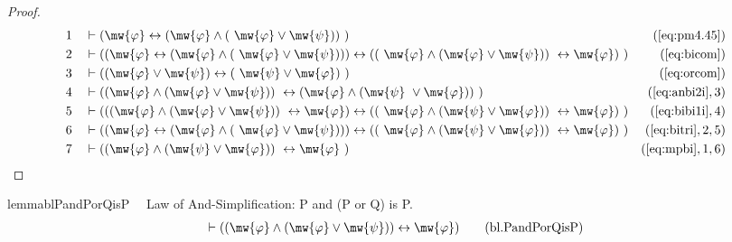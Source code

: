 \begin{proof}
\begin{align}
  1 &&  & \vdash ( \mw{\varphi} \leftrightarrow ( \mw{\varphi} \wedge (
     ~\mw{\varphi} \vee \mw{\psi} ) )
     ~)&(\mbox{\ref{eq:pm4.45}})\notag
  \\ 2 &&  & \vdash ( ( \mw{\varphi} \leftrightarrow ( \mw{\varphi} \wedge (
     ~\mw{\varphi} \vee \mw{\psi} ) ) ) \leftrightarrow ( (
     ~\mw{\varphi} \wedge ( \mw{\varphi} \vee \mw{\psi} ) )
     ~\leftrightarrow \mw{\varphi} )
     ~)&(\mbox{\ref{eq:bicom}})\notag
  \\ 3 &&  & \vdash ( ( \mw{\varphi} \vee \mw{\psi} ) \leftrightarrow (
     ~\mw{\psi} \vee \mw{\varphi} )
     ~)&(\mbox{\ref{eq:orcom}})\notag
  \\ 4 &&  & \vdash ( ( \mw{\varphi} \wedge ( \mw{\varphi} \vee \mw{\psi} ) )
     ~\leftrightarrow ( \mw{\varphi} \wedge ( \mw{\psi}
     ~\vee \mw{\varphi} ) )
     ~)&(\mbox{\ref{eq:anbi2i}},3)\notag
  \\ 5 &&  & \vdash ( ( ( \mw{\varphi} \wedge ( \mw{\varphi} \vee \mw{\psi} ) )
     ~\leftrightarrow \mw{\varphi} ) \leftrightarrow ( (
     ~\mw{\varphi} \wedge ( \mw{\psi} \vee \mw{\varphi} ) )
     ~\leftrightarrow \mw{\varphi} )
     ~)&(\mbox{\ref{eq:bibi1i}},4)\notag
  \\ 6 &&  & \vdash ( ( \mw{\varphi} \leftrightarrow ( \mw{\varphi} \wedge (
     ~\mw{\varphi} \vee \mw{\psi} ) ) ) \leftrightarrow ( (
     ~\mw{\varphi} \wedge ( \mw{\psi} \vee \mw{\varphi} ) )
     ~\leftrightarrow \mw{\varphi} )
     ~)&(\mbox{\ref{eq:bitri}},2,5)\notag
  \\ 7 &&  & \vdash ( ( \mw{\varphi} \wedge ( \mw{\psi} \vee \mw{\varphi} ) )
     ~\leftrightarrow \mw{\varphi}
     ~)&(\mbox{\ref{eq:mpbi}},1,6)\notag
\end{align}
\end{proof}

\begin{restatable}{lemma}{blPandPorQisP}~~ Law of And-Simplification: P and (P
or Q) is P.
\begin{align}
\vdash ( ( \mw{\varphi} \wedge ( \mw{\varphi} \vee \mw{\psi} ) )
    \leftrightarrow \mw{\varphi} )\label{eq:bl.PandPorQisP}\tag{bl.PandPorQisP}
\end{align}
\end{restatable}

